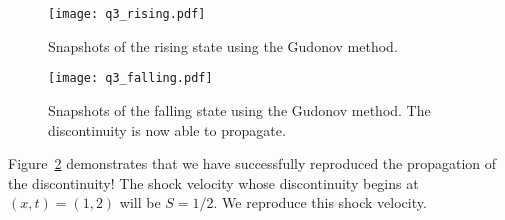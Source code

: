 \documentclass{article}
\begin{document}
\begin{homeworkProblem}
    
    \begin{figure}[!ht]
    \begin{center}
        
        \texttt{[image: q3\_rising.pdf]}

        \caption{\label{fig:q3_rising} Snapshots of the rising state using the
        Gudonov method.}

    \end{center}
    \end{figure}

    \begin{figure}[!ht]
    \begin{center}
        
        \texttt{[image: q3\_falling.pdf]}

        \caption{\label{fig:q3_falling} Snapshots of the falling state using
        the Gudonov method. The discontinuity is now able to propagate.}

    \end{center}
    \end{figure}

    Figure~\ref{fig:q3_falling} demonstrates that we have successfully
    reproduced the propagation of the discontinuity! The shock velocity whose
    discontinuity begins at $(x,t) = (1,2)$ will be $S = 1/2$. We reproduce
    this shock velocity.


\end{homeworkProblem} \clearpage
\end{document}
